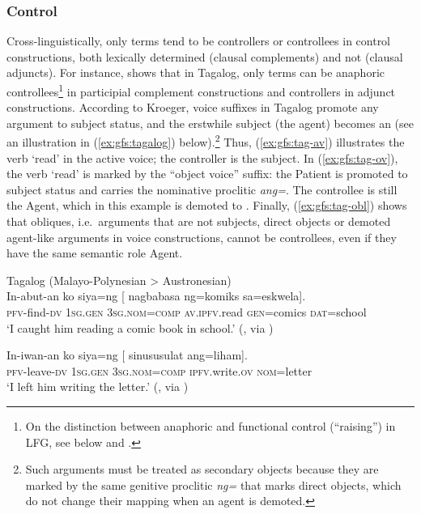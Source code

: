 \documentclass[output=paper]{../langscibook}
\begin{document}
 \subsubsection{Control}\label{sec:GFs:Control} Cross-linguistically, only terms tend to be controllers or controllees in control constructions, both lexically determined (clausal complements) and not (clausal adjuncts).  For instance, \citet{Kroeger93} shows that in Tagalog, only terms can be anaphoric controllees\footnote{On the distinction between anaphoric and functional control (``raising'') in LFG, see  below and .} in participial complement constructions and controllers in adjunct constructions. According to Kroeger, voice suffixes in Tagalog promote any argument to subject status, and the erstwhile subject (the agent) becomes an {\OBJTHETA} (see an illustration in (\ref{ex:gfs:tagalog}) below).\footnote{Such arguments must be treated as secondary objects because they are marked by the same genitive proclitic \textit{ng=} that marks direct objects, which do not change their mapping when an agent is demoted.} Thus, (\ref{ex:gfs:tag-av}) illustrates the verb `read' in the active voice; the controller is the subject. In (\ref{ex:gfs:tag-ov}), the verb `read' is marked by the ``object voice'' suffix: the Patient is promoted to subject status and carries the nominative proclitic \textit{ang=}. The controllee is still the Agent, which in this example is demoted to {}. Finally, (\ref{ex:gfs:tag-obl}) shows that obliques, i.e.\ arguments that are not subjects, direct objects or demoted agent-like arguments in voice constructions, cannot be controllees, even if they have the same semantic role Agent.
 
 \ea\label{ex:gfs:tag-av}
 Tagalog (Malayo-Polynesian > Austronesian)\\
 \gll In-abut-an ko siya=ng [ nagbabasa {\GAP}\textsubscript{\SUBJ} ng=komiks sa=eskwela].\\
 \textsc{pfv}-find-\textsc{dv} \textsc{1sg.gen} \textsc{3sg.nom=comp} {} \textsc{av.ipfv}.read {} \textsc{gen}=comics \textsc{dat}=school\\
 \trans `I caught him reading a comic book in school.' (\cite{Kroeger93}, via \cite[16]{DLM:LFG})
 
 \ex\label{ex:gfs:tag-ov}
 \gll In-iwan-an ko siya=ng [ sinususulat {\GAP}\textsubscript{{}} ang=liham].\\
 \textsc{pfv}-leave-\textsc{dv} \textsc{1sg.gen} \textsc{3sg.nom=comp} {} \textsc{ipfv}.write.\textsc{ov} {} \textsc{nom}=letter\\
 \trans `I left him writing the letter.' (\cite{Kroeger93}, via \cite[16]{DLM:LFG})\\
 
\end{document}
